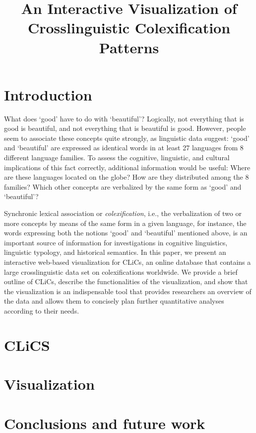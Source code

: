 \documentclass[10pt, a4paper]{article}
\title{An Interactive Visualization of Crosslinguistic Colexification Patterns}
\begin{document}
\maketitleabstract

\section{Introduction}

What does `good' have to do with `beautiful'? Logically, not everything that is good is beautiful, and not everything that is beautiful is good. However, people seem to associate these concepts quite strongly, as linguistic data suggest: `good' and `beautiful' are expressed as identical words in at least 27 languages from 8 different language families. To assess the cognitive, linguistic, and cultural implications of this fact correctly, additional information would be useful: Where are these languages located on the globe? How are they distributed among the 8 families? Which other concepts are verbalized by the same form as `good' and `beautiful'?

Synchronic lexical association or \textsl{colexification}, i.e., the verbalization of two or more concepts by means of the same form in a given language, for instance, the words expressing both the notions `good' and `beautiful' mentioned above, is an important source of information for investigations in cognitive linguistics, linguistic typology, and historical semantics. In this paper, we present an interactive web-based visualization for CLiCs, an online database that contains a large crosslinguistic data set on colexifications worldwide. We provide a brief outline of CLiCs, describe the functionalities of the visualization, and show that the visualization is an indispensable tool that provides researchers an overview of the data and allows them to concisely plan further quantitative analyses according to their needs.

\section{CLiCS}



\section{Visualization}



\section{Conclusions and future work}
\end{document}

